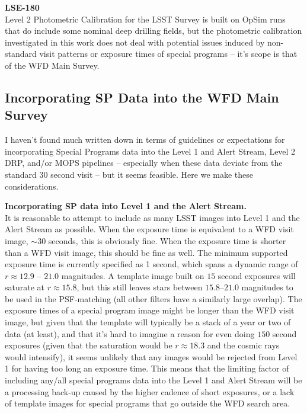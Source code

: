 \documentclass[DM,lsstdraft,toc]{lsstdoc}
\begin{document}
\noindent \textbf{LSE-180}\\
Level 2 Photometric Calibration for the LSST Survey \cite{LSE-180} is built on OpSim runs that do include some nominal deep drilling fields, but the photometric calibration investigated in this work does not deal with potential issues induced by non-standard visit patterns or exposure times of special programs -- it's scope is that of the WFD Main Survey. 


\subsection{Incorporating SP Data into the WFD Main Survey}\label{ssec:dmdocs_SPinWFD}

I haven't found much written down in terms of guidelines or expectations for incorporating Special Programs data into the Level 1 and Alert Stream, Level 2 DRP, and/or MOPS pipelines -- especially when these data deviate from the standard 30 second visit -- but it seems feasible. Here we make these considerations.

\noindent \textbf{Incorporating SP data into Level 1 and the Alert Stream.} \\
It is reasonable to attempt to include as many LSST images into Level 1 and the Alert Stream as possible. When the exposure time is equivalent to a WFD visit image, $\sim 30$ seconds, this is obviously fine. When the exposure time is shorter than a WFD visit image, this should be fine as well. The minimum supported exposure time is currently specified as 1 second, which spans a dynamic range of $r \approx 12.9$ -- $21.0$ magnitudes. A template image built on $15$ second exposures will saturate at $r \approx 15.8$, but this still leaves stars between $15.8$--$21.0$ magnitudes to be used in the PSF-matching (all other filters have a similarly large overlap). The exposure times of a special program image might be longer than the WFD visit image, but given that the template will typically be a stack of a year or two of data (at least), and that it's hard to imagine a reason for even doing $150$ second exposures (given that the saturation would be $r\approx 18.3$ and the cosmic rays would intensify), it seems unlikely that any images would be rejected from Level 1 for having too long an exposure time. This means that the limiting factor of including any/all special programs data into the Level 1 and Alert Stream will be a processing back-up caused by the higher cadence of short exposures, or a lack of template images for special programs that go outside the WFD search area.
\end{document}
